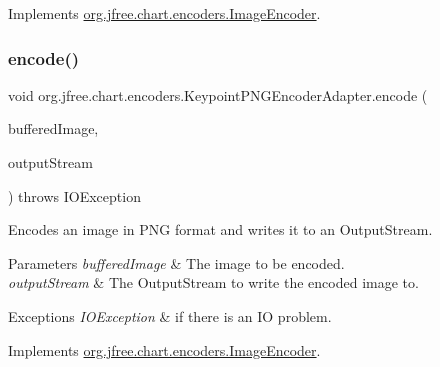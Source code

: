 Implements \mbox{\hyperlink{interfaceorg_1_1jfree_1_1chart_1_1encoders_1_1_image_encoder_a3290449de5246d80ca626835e5dac183}{org.\+jfree.\+chart.\+encoders.\+Image\+Encoder}}.

\mbox{\label{classorg_1_1jfree_1_1chart_1_1encoders_1_1_keypoint_p_n_g_encoder_adapter_ae839184a415b924b8ee0a47c5df1234d}} 
\subsubsection{\texorpdfstring{encode()}{encode()}\hspace{0.1cm}{\footnotesize\ttfamily [2/2]}}
{\footnotesize\ttfamily void org.\+jfree.\+chart.\+encoders.\+Keypoint\+P\+N\+G\+Encoder\+Adapter.\+encode (\begin{DoxyParamCaption}\item[{Buffered\+Image}]{buffered\+Image,  }\item[{Output\+Stream}]{output\+Stream }\end{DoxyParamCaption}) throws I\+O\+Exception}

Encodes an image in P\+NG format and writes it to an {\ttfamily Output\+Stream}.


\begin{DoxyParams}{Parameters}
{\em buffered\+Image} & The image to be encoded. \\
\hline
{\em output\+Stream} & The Output\+Stream to write the encoded image to. \\
\hline
\end{DoxyParams}

\begin{DoxyExceptions}{Exceptions}
{\em I\+O\+Exception} & if there is an IO problem. \\
\hline
\end{DoxyExceptions}


Implements \mbox{\hyperlink{interfaceorg_1_1jfree_1_1chart_1_1encoders_1_1_image_encoder_ad9396ba6a8a9c6f490a31f36f2226dac}{org.\+jfree.\+chart.\+encoders.\+Image\+Encoder}}.

\mbox{\label{classorg_1_1jfree_1_1chart_1_1encoders_1_1_keypoint_p_n_g_encoder_adapter_ab92d602383fbc7db9084a9c7a5ecd0c5}} 
